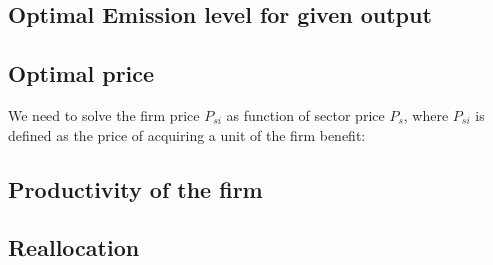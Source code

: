 \documentclass[11pt]{article}
\begin{document}
\subsection{Optimal Emission level for given output}\label{Ap:optimal emission level}

\subsection{Optimal price}\label{Ap:optimal price}
We need to solve the firm price $P_{si}$ as function of sector price $P_s$, where $P_{si}$ is defined as the price of acquiring a unit of the firm benefit:
    
\subsection{Productivity of the firm}\label{Ap:productivity}




\subsection{Reallocation} \label{Ap:reallocation}



\end{document}
